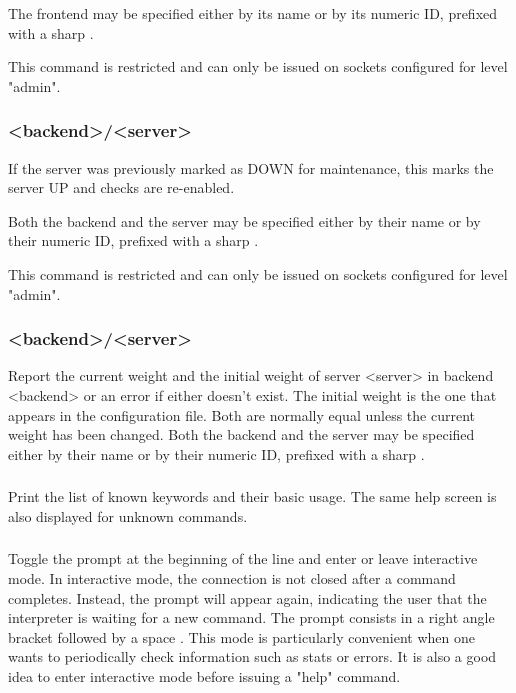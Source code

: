   The frontend may be specified either by its name or by its numeric ID,
  prefixed with a sharp \chr{\#}.

  This command is restricted and can only be issued on sockets configured for
  level "admin".

\subsubsection[enable server]{ <backend>/<server>}

  If the server was previously marked as DOWN for maintenance, this marks the
  server UP and checks are re-enabled.

  Both the backend and the server may be specified either by their name or by
  their numeric ID, prefixed with a sharp \chr{\#}.

  This command is restricted and can only be issued on sockets configured for
  level "admin".

\subsubsection[get weight]{ <backend>/<server>}

  Report the current weight and the initial weight of server <server> in
  backend <backend> or an error if either doesn't exist. The initial weight is
  the one that appears in the configuration file. Both are normally equal
  unless the current weight has been changed. Both the backend and the server
  may be specified either by their name or by their numeric ID, prefixed with a
  sharp \chr{\#}.

\subsubsection[help]{}

  Print the list of known keywords and their basic usage. The same help screen
  is also displayed for unknown commands.

\subsubsection[prompt]{}

  Toggle the prompt at the beginning of the line and enter or leave interactive
  mode. In interactive mode, the connection is not closed after a command
  completes. Instead, the prompt will appear again, indicating the user that
  the interpreter is waiting for a new command. The prompt consists in a right
  angle bracket followed by a space \chr{> }. This mode is particularly convenient
  when one wants to periodically check information such as stats or errors.
  It is also a good idea to enter interactive mode before issuing a "help"
  command.

